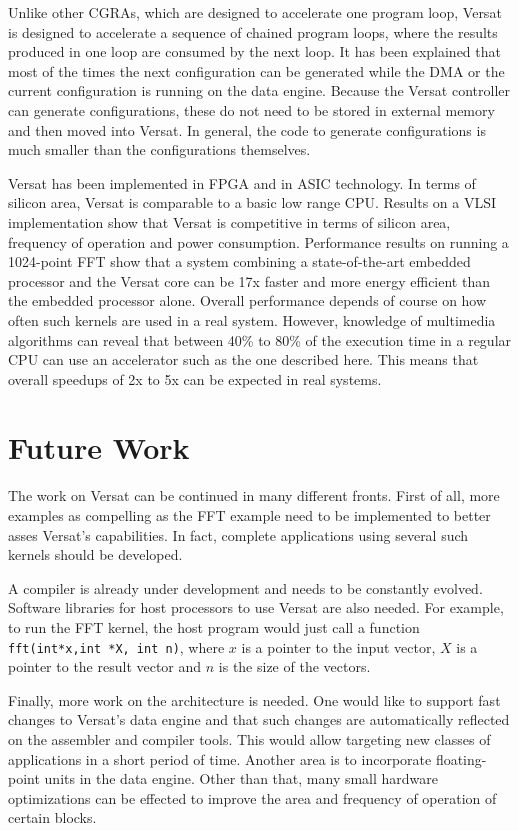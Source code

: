 Unlike other CGRAs, which are designed to accelerate one program loop,
Versat is designed to accelerate a sequence of chained program loops,
where the results produced in one loop are consumed by the next loop. It
has been explained that most of the times the next configuration can
be generated while the DMA or the current configuration is running on
the data engine. Because the Versat controller can generate
configurations, these do not need to be stored in external memory and
then moved into Versat. In general, the code to generate
configurations is much smaller than the configurations themselves.

Versat has been implemented in FPGA and in ASIC technology.  In terms
of silicon area, Versat is comparable to a basic low range CPU.
Results on a VLSI implementation show that Versat is competitive in
terms of silicon area, frequency of operation and power
consumption. Performance results on running a 1024-point FFT show that
a system combining a state-of-the-art embedded processor and the
Versat core can be 17x faster and more energy efficient than the
embedded processor alone. Overall performance depends of course on how
often such kernels are used in a real system. However, knowledge of
multimedia algorithms can reveal that between 40\% to 80\% of the
execution time in a regular CPU can use an accelerator such as the one
described here. This means that overall speedups of 2x to 5x can be
expected in real systems.



\section{Future Work}
\label{section:future}

The work on Versat can be continued in many different fronts. First
of all, more examples as compelling as the FFT example need to be
implemented to better asses Versat's capabilities. In fact, complete
applications using several such kernels should be developed.

A compiler is already under development and needs to be constantly evolved. Software
libraries for host processors to use Versat are also needed. For
example, to run the FFT kernel, the host program would just call a
function {\tt fft(int*x,int *X, int n)}, where $x$ is a pointer to the
input vector, $X$ is a pointer to the result vector and $n$ is the
size of the vectors.

Finally, more work on the architecture is needed. One would like to
support fast changes to Versat's data engine and that such changes are
automatically reflected on the assembler and compiler tools. This
would allow targeting new classes of applications in a short period of
time. Another area is to incorporate floating-point units in the data
engine. Other than that, many small hardware optimizations can be
effected to improve the area and frequency of operation of certain
blocks.
